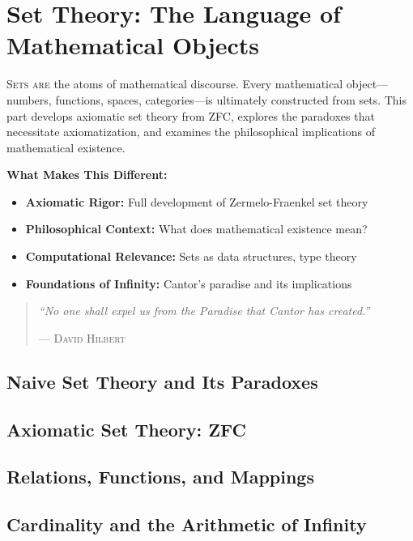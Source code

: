 \part{Set Theory: The Language of Mathematical Objects}
\label{part:set-theory}

\begin{partintro}
\lettrine[lines=3]{S}{ets are} the atoms of mathematical discourse. Every mathematical object—numbers, functions, spaces, categories—is ultimately constructed from sets. This part develops axiomatic set theory from ZFC, explores the paradoxes that necessitate axiomatization, and examines the philosophical implications of mathematical existence.

\vspace{1em}
\textbf{What Makes This Different:}
\begin{itemize}[noitemsep]
    \item \textbf{Axiomatic Rigor:} Full development of Zermelo-Fraenkel set theory
    \item \textbf{Philosophical Context:} What does mathematical existence mean?
    \item \textbf{Computational Relevance:} Sets as data structures, type theory
    \item \textbf{Foundations of Infinity:} Cantor's paradise and its implications
\end{itemize}

\begin{quote}
\textit{``No one shall expel us from the Paradise that Cantor has created.''}

\hfill--- \textsc{David Hilbert}
\end{quote}
\end{partintro}

\chapter{Naive Set Theory and Its Paradoxes}
\chapter{Axiomatic Set Theory: ZFC}
\chapter{Relations, Functions, and Mappings}
\chapter{Cardinality and the Arithmetic of Infinity}
